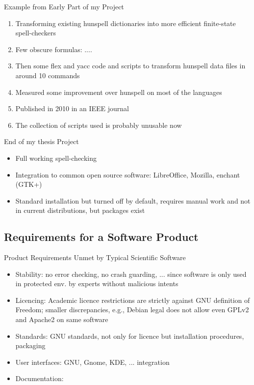 \documentclass[t,12pt]{beamer}
\begin{document}
\begin{frame}{Example from Early Part of my Project}
    \begin{enumerate}
        \item Transforming existing hunspell dictionaries into more efficient
            finite-state spell-checkers
        \item Few obscure formulas: ....
        \item Then some flex and yacc code and scripts
            to transform hunspell data files in around 10 commands
        \item Measured some improvement over hunspell on most of the languages
        \item Published in 2010 in an IEEE journal
        \item The collection of scripts used is probably unusable now
    \end{enumerate}
\end{frame}


\begin{frame}{End of my thesis Project}
    \begin{itemize}
        \item Full working spell-checking
        \item Integration to common open source software: LibreOffice,
            Mozilla, enchant (GTK+)
        \item Standard installation but turned off by default, requires manual
            work and not in current distributions, but packages exist
    \end{itemize}
\end{frame}

\subsection{Requirements for a Software Product}

\begin{frame}{Product Requirements Unmet by Typical Scientific Software}
    \begin{itemize}
        \item Stability: no error checking, no crash guarding, ... since software
            is only used in protected env. by experts without malicious intents
        \item Licencing: Academic licence restrictions are strictly against
            GNU definition of Freedom; smaller discrepancies, e.g., Debian legal
            does not allow even GPLv2 and Apache2 on same software
        \item Standards: GNU standards, not only for licence but installation
            procedures, packaging
        \item User interfaces: GNU, Gnome, KDE, ... integration
        \item Documentation: 
    \end{itemize}
\end{frame}
\end{document}
